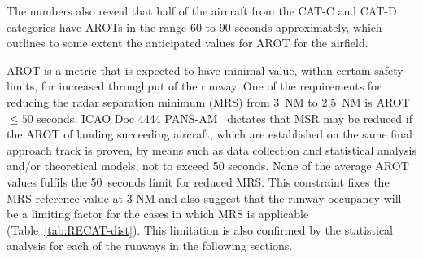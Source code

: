 \begin{table}[h]
\centering
{}
\caption[AROTs for the air traffic mix by RECAT]{AROT statistics for the air traffic mix at BIKF by RECAT-EU categories. The count is the number of landings during peak hours since October 2017}
\label{tab:AROT_RECAT_stats}
\end{table}

The numbers also reveal that half of the aircraft from the CAT-C and CAT-D categories have AROTs in the range 60 to 90 seconds approximately, which outlines to some extent the anticipated values for AROT for the airfield. 

AROT is a metric that is expected to have minimal value, within certain safety limits, for increased throughput of the runway. One of the requirements for reducing the radar separation minimum (MRS) from 3~NM to 2,5~NM is AROT $\leq50$ seconds. ICAO Doc 4444 PANS-AM~\cite{doc44444} dictates that MSR may be reduced if the AROT of landing succeeding aircraft, which are established on the same final approach track is proven, by means such as data collection and statistical analysis and/or theoretical models, not to exceed 50 seconds. None of the average AROT values fulfils the 50~seconds limit for reduced MRS. This constraint fixes the MRS reference value at 3 NM and also suggest that the runway occupancy will be a limiting factor for the cases in which MRS is applicable (Table~\ref{tab:RECAT-dist}). This limitation is also confirmed by the statistical analysis for each of the runways in the following sections.%

